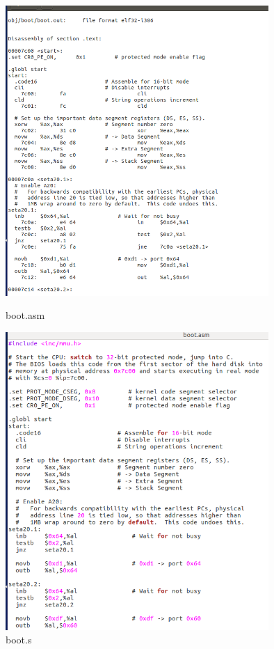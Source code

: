 \begin{figure}[H]
\centering
\begin{minipage}[t]{0.7\textwidth}
\centering
\includegraphics[width=10cm]{figure/boot_asm}
\caption{boot.asm}
\end{minipage}
\begin{minipage}[t]{0.7\textwidth}
\centering
\includegraphics[width=10cm]{figure/boot_s}
\caption{boot.s}
\end{minipage}
\end{figure}


